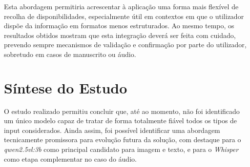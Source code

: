 Esta abordagem permitiria acrescentar à aplicação uma forma mais flexível de recolha de disponibilidades, especialmente útil em contextos em que o utilizador dispõe da informação em formatos menos estruturados.
Ao mesmo tempo, os resultados obtidos mostram que esta integração deverá ser feita com cuidado, prevendo sempre mecanismos de validação e confirmação por parte do utilizador, sobretudo em casos de manuscrito ou áudio.

\section{Síntese do Estudo}

O estudo realizado permitiu concluir que, até ao momento, não foi identificado um único modelo capaz de tratar de forma totalmente fiável todos os tipos de input considerados.
Ainda assim, foi possível identificar uma abordagem tecnicamente promissora para evolução futura da solução, com destaque para o \textit{qwen2.5vl:3b} como principal candidato para imagem e texto, e para o \textit{Whisper} como etapa complementar no caso do áudio.
